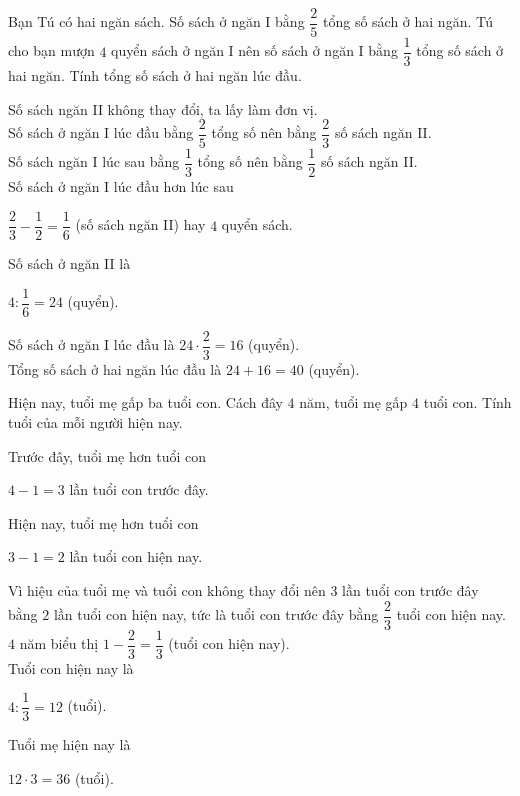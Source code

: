 \begin{bt}%
	Bạn Tú có hai ngăn sách. Số sách ở ngăn I bằng $\dfrac{2}{5}$ tổng số sách ở hai ngăn. Tú cho bạn mượn $4$ quyển sách ở ngăn I nên số sách ở ngăn I bằng $\dfrac{1}{3}$ tổng số sách ở hai ngăn. Tính tổng số sách ở hai ngăn lúc đầu.
	\loigiai
	{
		Số sách ngăn II không thay đổi, ta lấy làm đơn vị.\\
		Số sách ở ngăn I lúc đầu bằng $\dfrac{2}{5}$ tổng số nên bằng $\dfrac{2}{3}$ số sách ngăn II.\\
		Số sách ngăn I lúc sau bằng $\dfrac{1}{3}$ tổng số nên bằng $\dfrac{1}{2}$ số sách ngăn II. \\
		Số sách ở ngăn I lúc đầu hơn lúc sau 
		\begin{center}
			$\dfrac{2}{3}-\dfrac{1}{2}=\dfrac{1}{6}$ (số sách ngăn II) hay $4$ quyển sách.
		\end{center}
		Số sách ở ngăn II là
		\begin{center}
			$4:\dfrac{1}{6}=24$ (quyển).
		\end{center}
		Số sách ở ngăn I lúc đầu là $24\cdot \dfrac{2}{3}=16$ (quyển).\\
		Tổng số sách ở hai ngăn lúc đầu là $24+16=40$ (quyển).
		
	}
\end{bt}
\begin{bt}%
	Hiện nay, tuổi mẹ gấp ba tuổi con. Cách đây $4$ năm, tuổi mẹ gấp $4$ tuổi con. Tính tuổi của mỗi người hiện nay.
	\loigiai
	{
		Trước đây, tuổi mẹ hơn tuổi con
		\begin{center}
			$4-1=3$ lần tuổi con trước đây.
		\end{center}
		Hiện nay, tuổi mẹ hơn tuổi con
		\begin{center}
			$3-1=2$ lần tuổi con hiện nay.
		\end{center}
		Vì hiệu của tuổi mẹ và tuổi con không thay đổi nên $3$ lần tuổi con trước đây bằng $2$ lần tuổi con hiện nay, tức là tuổi con trước đây bằng $\dfrac{2}{3}$ tuổi con hiện nay.\\
		$4$ năm biểu thị $1-\dfrac{2}{3}=\dfrac{1}{3}$ (tuổi con hiện nay).\\
		Tuổi con hiện nay là 
		\begin{center}
			$4:\dfrac{1}{3}=12$ (tuổi).
		\end{center}
		Tuổi mẹ hiện nay là
		\begin{center}
			$12\cdot 3=36$ (tuổi).
		\end{center}
	}
\end{bt}
